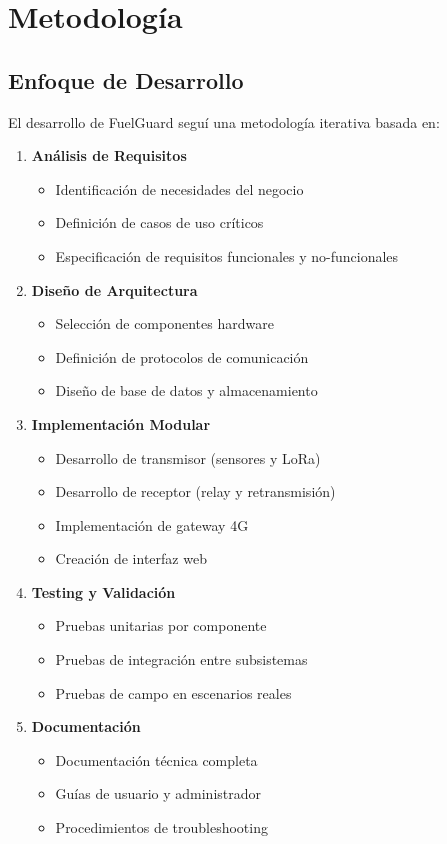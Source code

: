 \documentclass[12pt,a4paper,oneside]{report}
\begin{document}
\chapter{Metodología}

\section{Enfoque de Desarrollo}

El desarrollo de FuelGuard seguí una metodología iterativa basada en:

\begin{enumerate}
    \item \textbf{Análisis de Requisitos}
    \begin{itemize}
        \item Identificación de necesidades del negocio
        \item Definición de casos de uso críticos
        \item Especificación de requisitos funcionales y no-funcionales
    \end{itemize}
    
    \item \textbf{Diseño de Arquitectura}
    \begin{itemize}
        \item Selección de componentes hardware
        \item Definición de protocolos de comunicación
        \item Diseño de base de datos y almacenamiento
    \end{itemize}
    
    \item \textbf{Implementación Modular}
    \begin{itemize}
        \item Desarrollo de transmisor (sensores y LoRa)
        \item Desarrollo de receptor (relay y retransmisión)
        \item Implementación de gateway 4G
        \item Creación de interfaz web
    \end{itemize}
    
    \item \textbf{Testing y Validación}
    \begin{itemize}
        \item Pruebas unitarias por componente
        \item Pruebas de integración entre subsistemas
        \item Pruebas de campo en escenarios reales
    \end{itemize}
    
    \item \textbf{Documentación}
    \begin{itemize}
        \item Documentación técnica completa
        \item Guías de usuario y administrador
        \item Procedimientos de troubleshooting
    \end{itemize}
\end{enumerate}
\end{document}
